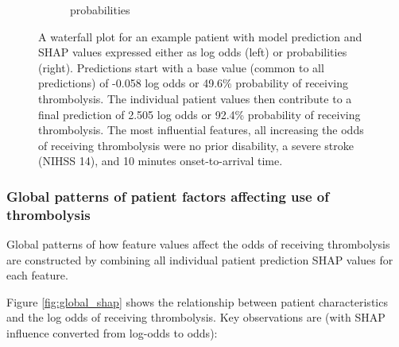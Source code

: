 \begin{figure}
\begin{subfigure}[b]{0.48\textwidth}
        \caption{probabilities}
        \label{fig:waterfall_subfig2}
    \end{subfigure}
    \caption{A waterfall plot for an example patient with model prediction and SHAP values expressed either as log odds (left) or probabilities (right). Predictions start with a base value (common to all predictions) of -0.058 log odds or 49.6\% probability of receiving thrombolysis. The individual patient values then contribute to a final prediction of 2.505 log odds or 92.4\% probability of receiving thrombolysis. The most influential features, all increasing the odds of receiving thrombolysis were no prior disability, a severe stroke (NIHSS 14), and 10 minutes onset-to-arrival time.}
    \label{fig:waterfall}
\end{figure}

\subsubsection{Global patterns of patient factors affecting use of thrombolysis}

Global patterns of how feature values affect the odds of receiving thrombolysis are constructed by combining all individual patient prediction SHAP values for each feature. 

Figure \ref{fig:global_shap} shows the relationship between patient characteristics and the log odds of receiving thrombolysis. Key observations are (with SHAP influence converted from log-odds to odds):

